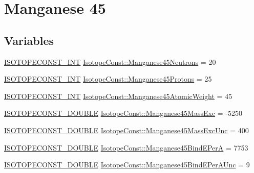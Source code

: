 \hypertarget{group___isotope_const-_manganese-_mn45}{}\section{Manganese 45}
\label{group___isotope_const-_manganese-_mn45}
\subsection*{Variables}
\begin{DoxyCompactItemize}
\item 
\mbox{\hyperlink{group___isotope_const-_macros_ga5f18360b3e99483a35c32d789e62621c}{I\+S\+O\+T\+O\+P\+E\+C\+O\+N\+S\+T\+\_\+\+I\+NT}} \mbox{\hyperlink{group___isotope_const-_manganese-_mn45_ga4ab83dfaf02f199e6476814ac5490f07}{Isotope\+Const\+::\+Manganese45\+Neutrons}} = 20
\item 
\mbox{\hyperlink{group___isotope_const-_macros_ga5f18360b3e99483a35c32d789e62621c}{I\+S\+O\+T\+O\+P\+E\+C\+O\+N\+S\+T\+\_\+\+I\+NT}} \mbox{\hyperlink{group___isotope_const-_manganese-_mn45_ga1a4262b0dceb36dd33fd9ddde4ab7fd8}{Isotope\+Const\+::\+Manganese45\+Protons}} = 25
\item 
\mbox{\hyperlink{group___isotope_const-_macros_ga5f18360b3e99483a35c32d789e62621c}{I\+S\+O\+T\+O\+P\+E\+C\+O\+N\+S\+T\+\_\+\+I\+NT}} \mbox{\hyperlink{group___isotope_const-_manganese-_mn45_gadcca457a8a678853ba2ced1aeb2fe631}{Isotope\+Const\+::\+Manganese45\+Atomic\+Weight}} = 45
\item 
\mbox{\hyperlink{group___isotope_const-_macros_ga8f45a7272ce02c0b4c65c44636ed719a}{I\+S\+O\+T\+O\+P\+E\+C\+O\+N\+S\+T\+\_\+\+D\+O\+U\+B\+LE}} \mbox{\hyperlink{group___isotope_const-_manganese-_mn45_gaf211d7fd19c16428bbe5b62bb7aa494d}{Isotope\+Const\+::\+Manganese45\+Mass\+Exc}} = -\/5250
\item 
\mbox{\hyperlink{group___isotope_const-_macros_ga8f45a7272ce02c0b4c65c44636ed719a}{I\+S\+O\+T\+O\+P\+E\+C\+O\+N\+S\+T\+\_\+\+D\+O\+U\+B\+LE}} \mbox{\hyperlink{group___isotope_const-_manganese-_mn45_gac4ed1b06eecef4c797afa12196b3fca5}{Isotope\+Const\+::\+Manganese45\+Mass\+Exc\+Unc}} = 400
\item 
\mbox{\hyperlink{group___isotope_const-_macros_ga8f45a7272ce02c0b4c65c44636ed719a}{I\+S\+O\+T\+O\+P\+E\+C\+O\+N\+S\+T\+\_\+\+D\+O\+U\+B\+LE}} \mbox{\hyperlink{group___isotope_const-_manganese-_mn45_ga51aaf0be126f1bc16d626485f63be6da}{Isotope\+Const\+::\+Manganese45\+Bind\+E\+PerA}} = 7753
\item 
\mbox{\hyperlink{group___isotope_const-_macros_ga8f45a7272ce02c0b4c65c44636ed719a}{I\+S\+O\+T\+O\+P\+E\+C\+O\+N\+S\+T\+\_\+\+D\+O\+U\+B\+LE}} \mbox{\hyperlink{group___isotope_const-_manganese-_mn45_ga521addcd835b012523c3c498b8af1fac}{Isotope\+Const\+::\+Manganese45\+Bind\+E\+Per\+A\+Unc}} = 9

\end{DoxyCompactItemize}
